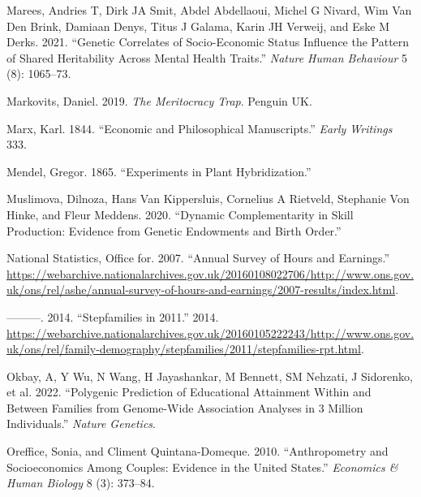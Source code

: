 \documentclass[
]{article}
\newlength{\cslhangindent}
\newlength{\cslentryspacingunit} %
\newenvironment{CSLReferences}[2] %
 {%
  \setlength{\parindent}{0pt}
  \ifodd #1
  \let\oldpar\par
  \def\par{\hangindent=\cslhangindent\oldpar}
  \fi
  \setlength{\parskip}{#2\cslentryspacingunit}
 }%
 {}
\theoremstyle{definition}
\theoremstyle{definition}
\theoremstyle{definition}
\theoremstyle{definition}
\theoremstyle{remark}
\begin{document}
\begin{CSLReferences}{1}{0}
\leavevmode{}%
Marees, Andries T, Dirk JA Smit, Abdel Abdellaoui, Michel G Nivard, Wim Van Den Brink, Damiaan Denys, Titus J Galama, Karin JH Verweij, and Eske M Derks. 2021. {``Genetic Correlates of Socio-Economic Status Influence the Pattern of Shared Heritability Across Mental Health Traits.''} \emph{Nature Human Behaviour} 5 (8): 1065--73.

\leavevmode{}%
Markovits, Daniel. 2019. \emph{The Meritocracy Trap}. Penguin UK.

\leavevmode{}%
Marx, Karl. 1844. {``Economic and Philosophical Manuscripts.''} \emph{Early Writings} 333.

\leavevmode{}%
Mendel, Gregor. 1865. {``Experiments in Plant Hybridization.''}

\leavevmode{}%
Muslimova, Dilnoza, Hans Van Kippersluis, Cornelius A Rietveld, Stephanie Von Hinke, and Fleur Meddens. 2020. {``Dynamic Complementarity in Skill Production: Evidence from Genetic Endowments and Birth Order.''}

\leavevmode{}%
National Statistics, Office for. 2007. {``Annual Survey of Hours and Earnings.''} \url{https://webarchive.nationalarchives.gov.uk/20160108022706/http://www.ons.gov.uk/ons/rel/ashe/annual-survey-of-hours-and-earnings/2007-results/index.html}.

\leavevmode{}%
---------. 2014. {``Stepfamilies in 2011.''} 2014. \url{https://webarchive.nationalarchives.gov.uk/20160105222243/http://www.ons.gov.uk/ons/rel/family-demography/stepfamilies/2011/stepfamilies-rpt.html}.

\leavevmode{}%
Okbay, A, Y Wu, N Wang, H Jayashankar, M Bennett, SM Nehzati, J Sidorenko, et al. 2022. {``Polygenic Prediction of Educational Attainment Within and Between Families from Genome-Wide Association Analyses in 3 Million Individuals.''} \emph{Nature Genetics}.

\leavevmode{}%
Oreffice, Sonia, and Climent Quintana-Domeque. 2010. {``Anthropometry and Socioeconomics Among Couples: Evidence in the United States.''} \emph{Economics \& Human Biology} 8 (3): 373--84.


\end{CSLReferences}
\end{document}
